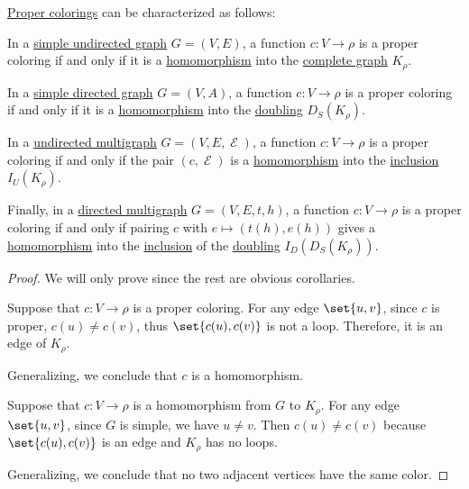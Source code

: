 \begin{proposition}\label{thm:graph_coloring_as_homomorphism}
  \hyperref[def:graph_coloring/proper]{Proper colorings} can be characterized as follows:

  \begin{thmenum}
     In a \hyperref[def:undirected_graph]{simple undirected graph} \( G = (V, E) \), a function \( c: V \to \rho \) is a proper coloring if and only if it is a \hyperref[def:undirected_graph/homomorphism]{homomorphism} into the \hyperref[def:complete_graph]{complete graph} \( K_\rho \).

     In a \hyperref[def:directed_graph]{simple directed graph} \( G = (V, A) \), a function \( c: V \to \rho \) is a proper coloring if and only if it is a \hyperref[def:directed_graph/homomorphism]{homomorphism} into the \hyperref[def:graph_functors/simple_doubling]{doubling} \( D_S(K_\rho) \).

     In a \hyperref[def:undirected_multigraph]{undirected multigraph} \( G = (V, E, \mscrE) \), a function \( c: V \to \rho \) is a proper coloring if and only if the pair \( (c, \mscrE) \) is a \hyperref[def:undirected_multigraph/homomorphism]{homomorphism} into the \hyperref[def:graph_functors/undirected_inclusion]{inclusion} \( I_U(K_\rho) \).

     Finally, in a \hyperref[def:directed_multigraph]{directed multigraph} \( G = (V, E, t, h) \), a function \( c: V \to \rho \) is a proper coloring if and only if pairing \( c \) with \( e \mapsto (t(h), e(h)) \) gives a \hyperref[def:directed_multigraph/homomorphism]{homomorphism} into the \hyperref[def:graph_functors/directed_inclusion]{inclusion} of the \hyperref[def:graph_functors/simple_doubling]{doubling} \( I_D(D_S(K_\rho)) \).
  \end{thmenum}
\end{proposition}
\begin{proof}
  We will only prove  since the rest are obvious corollaries.

  \SufficiencySubProof Suppose that \( c: V \to \rho \) is a proper coloring. For any edge \( \set{ u, v } \), since \( c \) is proper, \( c(u) \neq c(v) \), thus \( \set{ c(u), c(v) } \) is not a loop. Therefore, it is an edge of \( K_\rho \).

  Generalizing, we conclude that \( c \) is a homomorphism.

  \NecessitySubProof Suppose that \( c: V \to \rho \) is a homomorphism from \( G \) to \( K_\rho \). For any edge \( \set{ u, v } \), since \( G \) is simple, we have \( u \neq v \). Then \( c(u) \neq c(v) \) because \( \set{ c(u), c(v) } \) is an edge and \( K_\rho \) has no loops.

  Generalizing, we conclude that no two adjacent vertices have the same color.
\end{proof}

